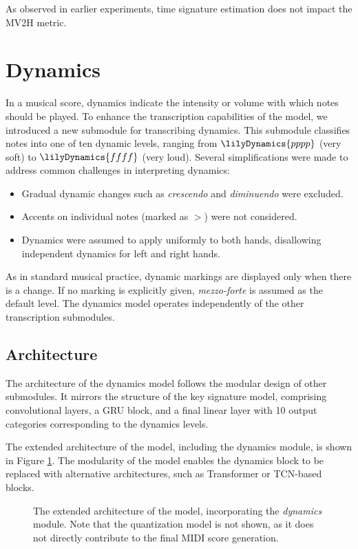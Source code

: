 As observed in earlier experiments, time signature estimation does not impact the MV2H metric.

\section{Dynamics}
In a musical score, dynamics indicate the intensity or volume with which notes should be played. To enhance the transcription capabilities of the model, we introduced a new submodule for transcribing dynamics. This submodule classifies notes into one of ten dynamic levels, ranging from $\lilyDynamics{pppp}$ (very soft) to $\lilyDynamics{ffff}$ (very loud). Several simplifications were made to address common challenges in interpreting dynamics:
\begin{itemize}
	\item Gradual dynamic changes such as \emph{crescendo} and \emph{diminuendo} were excluded.
	\item Accents on individual notes (marked as $>$) were not considered.
	\item Dynamics were assumed to apply uniformly to both hands, disallowing independent dynamics for left and right hands.
	\end{itemize}

As in standard musical practice, dynamic markings are displayed only when there is a change. If no marking is explicitly given, \emph{mezzo-forte} is assumed as the default level. The dynamics model operates independently of the other transcription submodules.

\subsection{Architecture}

The architecture of the dynamics model follows the modular design of other submodules. It mirrors the structure of the key signature model, comprising convolutional layers, a GRU block, and a final linear layer with 10 output categories corresponding to the dynamics levels.

The extended architecture of the model, including the dynamics module, is shown in Figure \ref{model_architecture_extended}. The modularity of the model enables the dynamics block to be replaced with alternative architectures, such as Transformer or TCN-based blocks.

\begin{figure}[!ht]
\centering
 \caption[Extended model architecture with dynamics module.]{The extended architecture of the model, incorporating the \emph{dynamics} module. Note that the quantization model is not shown, as it does not directly contribute to the final MIDI score generation.}
\label{model_architecture_extended}
\end{figure}

